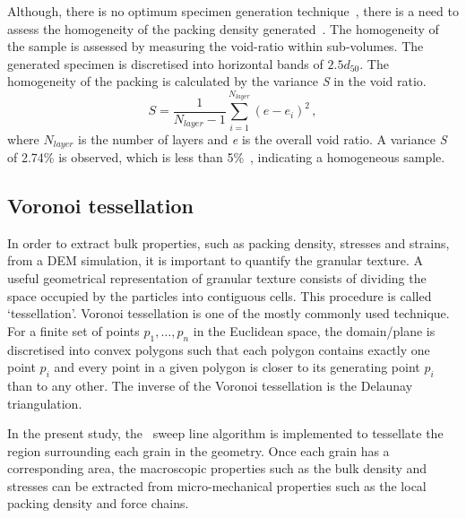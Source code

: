 Although, there is no optimum specimen generation 
technique~\citep{OSullivan2011}, there is a need to assess the homogeneity of 
the packing density generated~\citep{Jiang2003}. The homogeneity of the sample 
is assessed by measuring the void-ratio within sub-volumes. The generated 
specimen is discretised into horizontal bands of $2.5d_{50}$. The homogeneity 
of the packing is calculated by the variance \textit{S} in the void ratio.
%
\begin{equation}
S=\frac{1}{N_{layer}-1}\sum\limits_{i=1}^{N_{layer}}(e - e_i)^2 \,,
\end{equation}
%
where $N_{layer}$ is the number of layers and \textit{e} is the overall void 
ratio. A variance \textit{S} of 2.74\% is observed, which is less than 
5\%~\citet{Jiang2003}, indicating a homogeneous sample.


\subsection{Voronoi tessellation}

In order to extract bulk properties, such as packing density, stresses and 
strains, from a DEM simulation, it is important to quantify the granular 
texture. A useful geometrical representation of granular texture consists of 
dividing the space occupied by the particles into contiguous cells. This 
procedure is called `tessellation'. Voronoi tessellation is one of the mostly 
commonly used technique. For a finite set of points $p_1, \dots, p_n$ in the 
Euclidean space, the domain/plane is discretised into convex polygons such that 
each polygon contains exactly one point $p_i$ and every point in a given 
polygon is closer to its generating point $p_i$ than to any other. The inverse 
of the Voronoi tessellation is the Delaunay triangulation.

In the present study, the~\citet{Fortune1992} sweep line algorithm is 
implemented to 
tessellate the region surrounding each grain in the geometry. Once each grain 
has a corresponding area, the macroscopic properties such as the bulk density 
and stresses can be extracted from micro-mechanical properties such as the 
local packing density and force chains.

